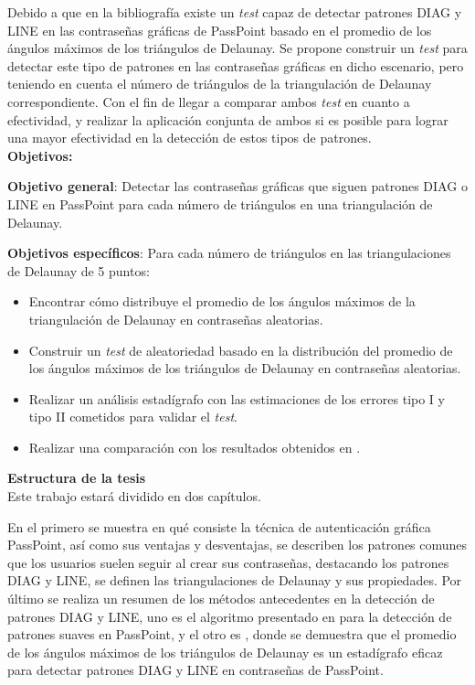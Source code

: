 \documentclass[12pt]{report}
\begin{document}
	\normalsize{
		Debido a que en la bibliografía existe un \textit{test} capaz de detectar patrones DIAG y LINE en las contraseñas gráficas de PassPoint basado en el promedio de los ángulos máximos de los triángulos de Delaunay. Se propone construir un \textit{test} para detectar este tipo de patrones en las contraseñas gráficas en dicho escenario, pero teniendo en cuenta el número de triángulos de la triangulación de Delaunay correspondiente. Con el fin de llegar a comparar ambos \textit{test} en cuanto a efectividad, y realizar la aplicación conjunta de ambos si es posible para lograr una mayor efectividad en la detección de estos tipos de patrones.
		}\\

	\large{\textbf{Objetivos:}}
	
	\normalsize{\textbf{Objetivo general}}: Detectar las contraseñas gráficas que siguen patrones DIAG o LINE en PassPoint para cada número de triángulos en una triangulación de Delaunay.
	
	\normalsize{\textbf{Objetivos específicos}}:
	Para cada número de triángulos  en las triangulaciones de Delaunay de 5 puntos:
	
	\begin{itemize}
		\item Encontrar cómo distribuye el promedio de los ángulos máximos de la triangulación de Delaunay en contraseñas aleatorias.
		\item Construir un \textit{test} de aleatoriedad basado en la distribución del promedio de los ángulos máximos de los triángulos de Delaunay en contraseñas aleatorias.
		
		\item Realizar un análisis estadígrafo con las estimaciones de los errores tipo I y tipo II cometidos para validar el \textit{test}.
		
		\item Realizar una comparación con los resultados obtenidos en \cite{13}.
		
	\end{itemize}
	
	
	{\large{\textbf{Estructura de la tesis}}}\\
	
	Este trabajo estará dividido en dos capítulos.
	
	En el primero se muestra en qué consiste la técnica de autenticación gráfica PassPoint, así como sus ventajas y desventajas, se describen los patrones comunes que los usuarios suelen seguir al crear sus contraseñas, destacando los patrones DIAG y LINE, se definen las triangulaciones de Delaunay y sus propiedades. Por último se realiza un resumen  de los métodos antecedentes en la detección de patrones DIAG y LINE, uno es el algoritmo presentado en \cite{3} para la detección de patrones suaves en PassPoint, y el otro es \cite{13}, donde se demuestra que el promedio de los ángulos máximos de los  triángulos de Delaunay es un estadígrafo eficaz para detectar patrones DIAG y LINE en contraseñas de PassPoint.
	
\end{document}
